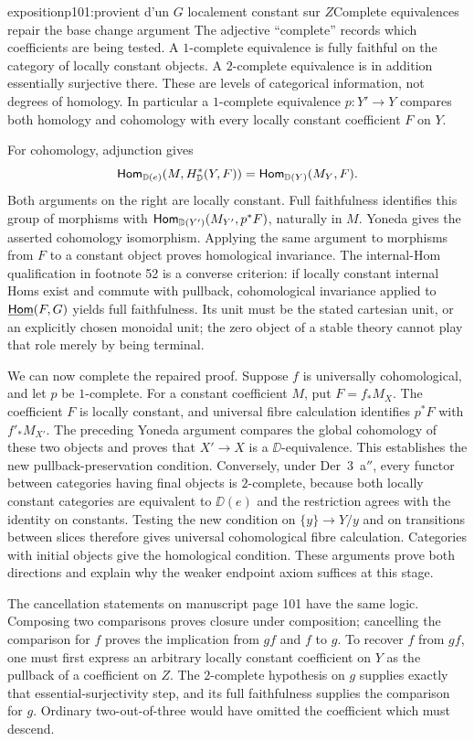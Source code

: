 \begin{dcomment}{exposition}{p101:provient d’un $G$ localement constant sur $Z$}{Complete equivalences repair the base change argument}
The adjective ``complete'' records which coefficients are being tested. A $1$-complete equivalence is fully faithful on the category of locally constant objects. A $2$-complete equivalence is in addition essentially surjective there. These are levels of categorical information, not degrees of homology. In particular a $1$-complete equivalence $p:Y'\to Y$ compares both homology and cohomology with every locally constant coefficient $F$ on $Y$.

For cohomology, adjunction gives
\[
 \mathsf{Hom}_{\mathbb{D}(e)}(M,H^*_{\mathbb{D}}(Y,F))
       =\mathsf{Hom}_{\mathbb{D}(Y)}(M_Y,F).
\]
Both arguments on the right are locally constant. Full faithfulness identifies this group of morphisms with $\mathsf{Hom}_{\mathbb{D}(Y')}(M_{Y'},p^*F)$, naturally in $M$. Yoneda gives the asserted cohomology isomorphism. Applying the same argument to morphisms from $F$ to a constant object proves homological invariance. The internal-Hom qualification in footnote 52 is a converse criterion: if locally constant internal Homs exist and commute with pullback, cohomological invariance applied to $\underline{\mathsf{Hom}}(F,G)$ yields full faithfulness. Its unit must be the stated cartesian unit, or an explicitly chosen monoidal unit; the zero object of a stable theory cannot play that role merely by being terminal.

We can now complete the repaired proof. Suppose $f$ is universally cohomological, and let $p$ be $1$-complete. For a constant coefficient $M$, put $F=f_*M_X$. The coefficient $F$ is locally constant, and universal fibre calculation identifies $p^*F$ with $f'_*M_{X'}$. The preceding Yoneda argument compares the global cohomology of these two objects and proves that $X'\to X$ is a $\DD$-equivalence. This establishes the new pullback-preservation condition. Conversely, under Der~3~a$''$, every functor between categories having final objects is $2$-complete, because both locally constant categories are equivalent to $\DD(e)$ and the restriction agrees with the identity on constants. Testing the new condition on $\{y\}\to Y/y$ and on transitions between slices therefore gives universal cohomological fibre calculation. Categories with initial objects give the homological condition. These arguments prove both directions and explain why the weaker endpoint axiom suffices at this stage.

The cancellation statements on manuscript page 101 have the same logic. Composing two comparisons proves closure under composition; cancelling the comparison for $f$ proves the implication from $gf$ and $f$ to $g$. To recover $f$ from $gf$, one must first express an arbitrary locally constant coefficient on $Y$ as the pullback of a coefficient on $Z$. The $2$-complete hypothesis on $g$ supplies exactly that essential-surjectivity step, and its full faithfulness supplies the comparison for $g$. Ordinary two-out-of-three would have omitted the coefficient which must descend.
\end{dcomment}


